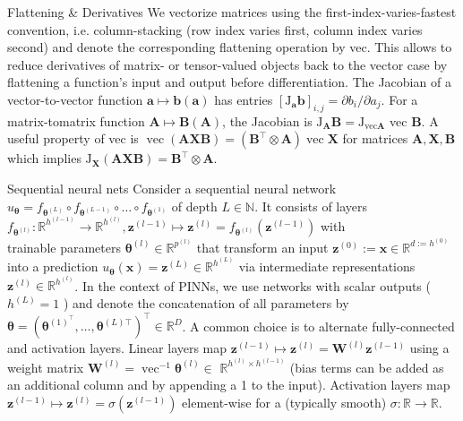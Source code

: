 \documentclass[10pt]{article}
\begin{document}
Flattening \& Derivatives We vectorize matrices using the first-index-varies-fastest convention, i.e. column-stacking (row index varies first, column index varies second) and denote the corresponding flattening operation by vec. This allows to reduce derivatives of matrix- or tensor-valued objects back to the vector case by flattening a function's input and output before differentiation. The Jacobian of a vector-to-vector function $\boldsymbol{a} \mapsto \boldsymbol{b}(\boldsymbol{a})$ has entries $\left[\mathrm{J}_{\boldsymbol{a}} \boldsymbol{b}\right]_{i, j}=\partial b_{i} / \partial a_{j}$. For a matrix-tomatrix function $\boldsymbol{A} \mapsto \boldsymbol{B}(\boldsymbol{A})$, the Jacobian is $\mathrm{J}_{\boldsymbol{A}} \boldsymbol{B}=\mathrm{J}_{\mathrm{vec} \boldsymbol{A}}$ vec $\boldsymbol{B}$. A useful property of vec is $\operatorname{vec}(\boldsymbol{A X B})=\left(\boldsymbol{B}^{\top} \otimes \boldsymbol{A}\right) \operatorname{vec} \boldsymbol{X}$ for matrices $\boldsymbol{A}, \boldsymbol{X}, \boldsymbol{B}$ which implies $\mathrm{J}_{\boldsymbol{X}}(\boldsymbol{A X B})=\boldsymbol{B}^{\top} \otimes \boldsymbol{A}$.

Sequential neural nets Consider a sequential neural network $u_{\boldsymbol{\theta}}=f_{\boldsymbol{\theta}^{(L)}} \circ f_{\boldsymbol{\theta}^{(L-1)}} \circ \ldots \circ f_{\boldsymbol{\theta}^{(1)}}$ of depth $L \in \mathbb{N}$. It consists of layers $f_{\boldsymbol{\theta}^{(l)}}: \mathbb{R}^{h^{(l-1)}} \rightarrow \mathbb{R}^{h^{(l)}}, \boldsymbol{z}^{(l-1)} \mapsto \boldsymbol{z}^{(l)}=f_{\boldsymbol{\theta}^{(l)}}\left(\boldsymbol{z}^{(l-1)}\right)$ with\\
trainable parameters $\boldsymbol{\theta}^{(l)} \in \mathbb{R}^{p^{(l)}}$ that transform an input $\boldsymbol{z}^{(0)}:=\boldsymbol{x} \in \mathbb{R}^{d:=h^{(0)}}$ into a prediction $u_{\boldsymbol{\theta}}(\boldsymbol{x})=\boldsymbol{z}^{(L)} \in \mathbb{R}^{h^{(L)}}$ via intermediate representations $\boldsymbol{z}^{(l)} \in \mathbb{R}^{h^{(l)}}$. In the context of PINNs, we use networks with scalar outputs ( $h^{(L)}=1$ ) and denote the concatenation of all parameters by $\boldsymbol{\theta}=\left(\boldsymbol{\theta}^{(1)^{\top}}, \ldots, \boldsymbol{\theta}^{(L) \top}\right)^{\top} \in \mathbb{R}^{D}$. A common choice is to alternate fully-connected and activation layers. Linear layers map $\boldsymbol{z}^{(l-1)} \mapsto \boldsymbol{z}^{(l)}=\boldsymbol{W}^{(l)} \boldsymbol{z}^{(l-1)}$ using a weight matrix $\boldsymbol{W}^{(l)}=\operatorname{vec}^{-1} \boldsymbol{\theta}^{(l)} \in$ $\mathbb{R}^{h^{(l)} \times h^{(l-1)}}$ (bias terms can be added as an additional column and by appending a 1 to the input). Activation layers map $\boldsymbol{z}^{(l-1)} \mapsto \boldsymbol{z}^{(l)}=\sigma\left(\boldsymbol{z}^{(l-1)}\right)$ element-wise for a (typically smooth) $\sigma: \mathbb{R} \rightarrow \mathbb{R}$.
\end{document}
